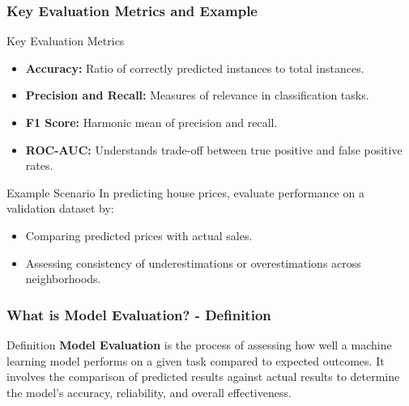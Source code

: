 \documentclass[aspectratio=169]{beamer}
\begin{document}
\begin{frame}[fragile]
    \frametitle{Key Evaluation Metrics and Example}
    
    \begin{block}{Key Evaluation Metrics}
        \begin{itemize}
            \item \textbf{Accuracy:} Ratio of correctly predicted instances to total instances. 
            \item \textbf{Precision and Recall:} Measures of relevance in classification tasks.
            \item \textbf{F1 Score:} Harmonic mean of precision and recall.
            \item \textbf{ROC-AUC:} Understands trade-off between true positive and false positive rates.
        \end{itemize}
    \end{block}
    
    \begin{block}{Example Scenario}
        In predicting house prices, evaluate performance on a validation dataset by:
        \begin{itemize}
            \item Comparing predicted prices with actual sales.
            \item Assessing consistency of underestimations or overestimations across neighborhoods.
        \end{itemize}
    \end{block}
\end{frame}

\begin{frame}[fragile]
    \frametitle{What is Model Evaluation? - Definition}
    \begin{block}{Definition}
        \textbf{Model Evaluation} is the process of assessing how well a machine learning model performs on a given task compared to expected outcomes. It involves the comparison of predicted results against actual results to determine the model's accuracy, reliability, and overall effectiveness.
    \end{block}
\end{frame}
\end{document}
